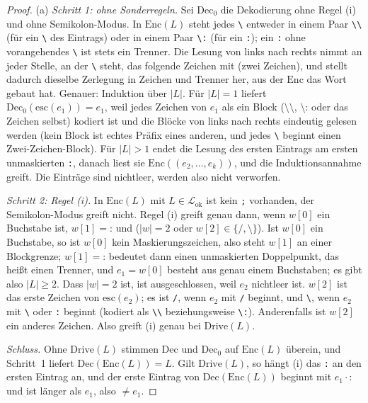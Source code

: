 \documentclass[a4paper,12pt,twoside]{report}
\DeclareRobustCommand{\_}{\ifmmode\mbox{\textunderscore}\else\textunderscore\allowbreak{}\fi}
\theoremstyle{definition}
\begin{document}
\begin{proof}
	(a) \emph{Schritt 1: ohne Sonderregeln.} Sei $\mathrm{Dec}_0$ die Dekodierung ohne Regel (i) und ohne Semikolon-Modus. In $\mathrm{Enc}(L)$ steht jedes \texttt{\textbackslash} entweder in einem Paar \texttt{\textbackslash\textbackslash} (für ein \texttt{\textbackslash} des Eintrags) oder in einem Paar \texttt{\textbackslash:} (für ein \texttt{:}); ein \texttt{:} ohne vorangehendes \texttt{\textbackslash} ist stets ein Trenner. Die Lesung von links nach rechts nimmt an jeder Stelle, an der \texttt{\textbackslash} steht, das folgende Zeichen mit (zwei Zeichen), und stellt dadurch dieselbe Zerlegung in Zeichen und Trenner her, aus der $\mathrm{Enc}$ das Wort gebaut hat. Genauer: Induktion über $|L|$. Für $|L|=1$ liefert $\mathrm{Dec}_0(\mathrm{esc}(e_1))=e_1$, weil jedes Zeichen von $e_1$ als ein Block ($\texttt{\textbackslash\textbackslash}$, $\texttt{\textbackslash:}$ oder das Zeichen selbst) kodiert ist und die Blöcke von links nach rechts eindeutig gelesen werden (kein Block ist echtes Präfix eines anderen, und jedes \texttt{\textbackslash} beginnt einen Zwei-Zeichen-Block). Für $|L|>1$ endet die Lesung des ersten Eintrags am ersten unmaskierten \texttt{:}, danach liest sie $\mathrm{Enc}((e_2,\ldots,e_k))$, und die Induktionsannahme greift. Die Einträge sind nichtleer, werden also nicht verworfen.

	\emph{Schritt 2: Regel (i).} In $\mathrm{Enc}(L)$ mit $L\in\mathcal L_{\mathrm{ok}}$ ist kein \texttt{;} vorhanden, der Semikolon-Modus greift nicht. Regel (i) greift genau dann, wenn $w[0]$ ein Buchstabe ist, $w[1]=\texttt{:}$ und ($|w|=2$ oder $w[2]\in\{\texttt{/},\texttt{\textbackslash}\}$). Ist $w[0]$ ein Buchstabe, so ist $w[0]$ kein Maskierungszeichen, also steht $w[1]$ an einer Blockgrenze; $w[1]=\texttt{:}$ bedeutet dann einen unmaskierten Doppelpunkt, das heißt einen Trenner, und $e_1=w[0]$ besteht aus genau einem Buchstaben; es gibt also $|L|\ge2$. Dass $|w|=2$ ist, ist ausgeschlossen, weil $e_2$ nichtleer ist. $w[2]$ ist das erste Zeichen von $\mathrm{esc}(e_2)$; es ist \texttt{/}, wenn $e_2$ mit \texttt{/} beginnt, und \texttt{\textbackslash}, wenn $e_2$ mit \texttt{\textbackslash} oder \texttt{:} beginnt (kodiert als \texttt{\textbackslash\textbackslash} beziehungsweise \texttt{\textbackslash:}). Anderenfalls ist $w[2]$ ein anderes Zeichen. Also greift (i) genau bei $\mathrm{Drive}(L)$.

	\emph{Schluss.} Ohne $\mathrm{Drive}(L)$ stimmen $\mathrm{Dec}$ und $\mathrm{Dec}_0$ auf $\mathrm{Enc}(L)$ überein, und Schritt~1 liefert $\mathrm{Dec}(\mathrm{Enc}(L))=L$. Gilt $\mathrm{Drive}(L)$, so hängt (i) das \texttt{:} an den ersten Eintrag an, und der erste Eintrag von $\mathrm{Dec}(\mathrm{Enc}(L))$ beginnt mit $e_1\cdot\texttt{:}$ und ist länger als $e_1$, also $\ne e_1$.


\end{proof}
\end{document}
